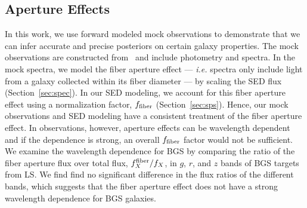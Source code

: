

\subsection{Aperture Effects}
In this work, we use forward modeled mock observations to demonstrate that we
can infer accurate and precise posteriors on certain galaxy properties.
The mock observations are constructed from \lgal~and include photometry and
spectra. 
In the mock spectra, we model the fiber aperture effect --- \emph{i.e.} spectra
only include light from a galaxy collected within its fiber diameter --- by
scaling the SED flux (Section~\ref{sec:spec}).
In our SED modeling, we account for this fiber aperture effect using a
normalization factor, $f_{\rm fiber}$ (Section~\ref{sec:sps}). 
Hence, our mock observations and SED modeling have a consistent treatment of
the fiber aperture effect. 
In observations, however, aperture effects can be wavelength
dependent~\citep{gerssen2012, richards2016} and if the dependence is strong,
an overall $f_{\rm fiber}$ factor would not be sufficient.
We examine the wavelength dependence for BGS by comparing the ratio of the
fiber aperture flux over total flux, $f^{\rm fiber}_X/f_X$, in $g$, $r$, and
$z$ bands of BGS targets from LS.
We find find no significant difference in the flux ratios of the different
bands, which suggests that the fiber aperture effect does not have a strong
wavelength dependence for BGS galaxies. 

